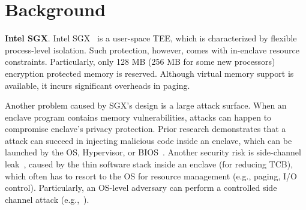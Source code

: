 \section{Background}\label{sec-background}

\noindent\textbf{Intel SGX}. Intel SGX~\cite{mckeen2013innovative} is a user-space TEE, which is characterized by flexible process-level isolation\DIFdelbegin {}\DIFdelend . Such protection, however, comes with in-enclave resource constraints. Particularly, only 128 MB (256 MB for some new processors) encryption protected memory is reserved. Although \DIFdelbegin {}\DIFdelend virtual memory support is available, it incurs significant overheads in paging\DIFaddbegin {}\DIFaddend . 


Another problem caused by SGX's \DIFdelbegin {}\DIFdelend design is a large attack surface. \DIFaddbegin {}\DIFaddend When an enclave program contains memory vulnerabilities, attacks can happen to compromise enclave's privacy protection. Prior research demonstrates that a \DIFdelbegin {}\DIFdelend \DIFaddbegin {}\DIFaddend attack can succeed in injecting malicious code inside an enclave, which can be launched by the OS, Hypervisor, or BIOS~\cite{lee2017hacking,biondo2018guard,schwarz2019practical}. %
Another security risk is side-channel leak~\cite{schwarz2017malware,lee2017inferring,gras2018translation}, caused by the thin software stack inside an enclave (for reducing TCB),  which often has to resort to the OS for resource management (e.g., paging, I/O control). Particularly, an OS-level adversary can perform a controlled side channel attack (e.g.,~\cite{xu2015controlled}).


